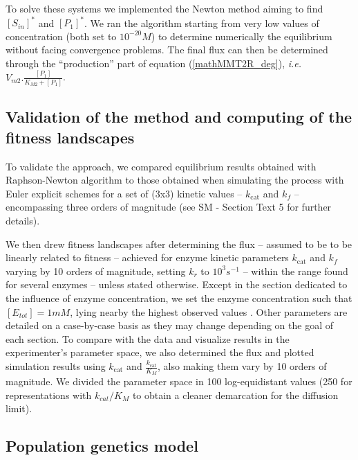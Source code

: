 \documentclass[11pt,onecolumn]{article}
\begin{document}
\normalsize
To solve these systems %
we implemented the Newton method \citep{Atkinson89} aiming to find $[S_{in}]^*$ and $[P_1]^*$. We ran the algorithm starting from very low values of concentration (both set to $10^{-20}M$) to determine numerically the equilibrium without facing convergence problems. The final flux can then be determined through the ``production'' part of equation (\ref{mathMMT2R_deg}), \textit{i.e.} $V_{m2}.\frac{[P_1]}{K_{M2}+[P_1]}$.


\subsection{Validation of the method and computing of the fitness landscapes}

To validate the approach, we compared equilibrium results obtained with Raphson-Newton algorithm to those obtained when simulating the process with Euler explicit schemes for a set of (3x3) kinetic values -- $k_\text{cat}$ and $k_f$ -- encompassing three orders of magnitude (see SM - Section Text 5 for further details).

We then drew fitness landscapes after determining the flux -- assumed to be to be linearly related to fitness -- achieved for enzyme kinetic parameters $k_\text{cat}$ and $k_f$ varying by 10 orders of magnitude, setting $k_r$ to $10^3 s^{-1}$ -- within the range found for several enzymes \citep{Klipp94,Knowles77} -- unless stated otherwise. Except in the section dedicated to the influence of enzyme concentration, we set the enzyme concentration such that $[E_{tot}]=1mM$, lying nearby the highest observed values \citep{Albe90,Noor16}. Other parameters are detailed on a case-by-case basis as they may change depending on the goal of each section. To compare with the data and visualize results in the experimenter's parameter space, we also determined the flux and plotted simulation results using $k_\text{cat}$ and $\frac{k_\text{cat}}{K_M}$, also making them vary by 10 orders of magnitude. We divided the parameter space in 100 log-equidistant values (250 for representations with $k_{cat}/K_M$ to obtain a cleaner demarcation for the diffusion limit).

\subsection{Population genetics model}
\end{document}
